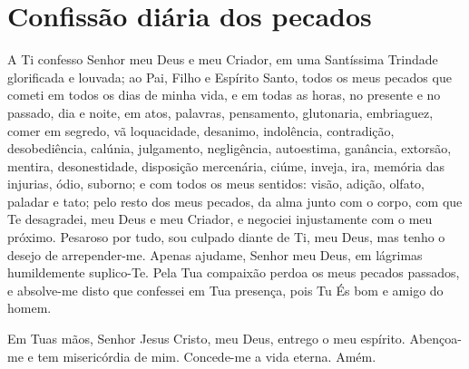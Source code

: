 \documentclass{subfiles}
\begin{document}
\section*{Confissão diária dos pecados}

A Ti confesso Senhor meu Deus e meu Criador, em uma Santíssima Trindade
glorificada e louvada; ao Pai, Filho e Espírito Santo, todos os meus pecados que
cometi em todos os dias de minha vida, e em todas as horas, no presente e no
passado, dia e noite, em atos, palavras, pensamento, glutonaria, embriaguez,
comer em segredo, vã loquacidade, desanimo, indolência, contradição,
desobediência, calúnia, julgamento, negligência, autoestima, ganância, extorsão,
mentira, desonestidade, disposição mercenária, ciúme, inveja, ira, memória das
injurias, ódio, suborno; e com todos os meus sentidos: visão, adição, olfato,
paladar e tato; pelo resto dos meus pecados, da alma junto com o corpo, com que
Te desagradei, meu Deus e meu Criador, e negociei injustamente com o meu
próximo. Pesaroso por tudo, sou culpado diante de Ti, meu Deus, mas tenho o
desejo de arrepender-me. Apenas ajudame, Senhor meu Deus, em lágrimas
humildemente suplico-Te. Pela Tua compaixão perdoa os meus pecados passados, e
absolve-me disto que confessei em Tua presença, pois Tu És bom e amigo do homem.


Em Tuas mãos, Senhor Jesus Cristo, meu Deus, entrego o meu espírito.
Abençoa-me e tem misericórdia de mim. Concede-me a vida eterna. Amém.
\end{document}
